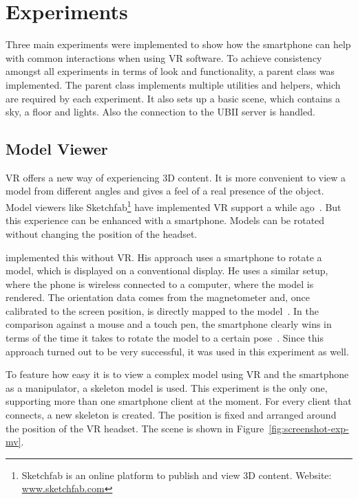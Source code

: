 \section{Experiments}\label{section:experiments}

Three main experiments were implemented to show how the smartphone can help with common interactions when using \ac{VR} software.
To achieve consistency amongst all experiments in terms of look and functionality, a parent class was implemented. The parent class implements multiple utilities and helpers, which are required by each experiment. It also sets up a basic scene, which contains a sky, a floor and lights.  Also the connection to the \ac{UBII} server is handled. 


\subsection{Model Viewer}\label{subsection:model-viewer}

\acl{VR} offers a new way of experiencing \ac{3D} content. It is more convenient to view a model from different angles and gives a feel of a real presence of the object. Model viewers like Sketchfab\footnote{Sketchfab is an online platform to publish and view 3D content. Website: \href{https://sketchfab.com}{www.sketchfab.com}} have implemented \ac{VR} support a while ago~\cite{Denoyel.2016}. But this experience can be enhanced with a smartphone. Models can be rotated without changing the position of the headset.

\citeauthor{Katzakis.2010} implemented this without \ac{VR}. His approach uses a smartphone to rotate a model, which is displayed on a conventional display. He uses a similar setup, where the phone is wireless connected to a computer, where the model is rendered. The orientation data comes from the magnetometer and, once calibrated to the screen position, is directly mapped to the model~\cite[139]{Katzakis.2010}. In the comparison against a mouse and a touch pen, the smartphone clearly wins in terms of the time it takes to rotate the model to a certain pose~\cite[140]{Katzakis.2010}. 
Since this approach turned out to be very successful, it was used in this experiment as well. 

To feature how easy it is to view a complex model using VR and the smartphone as a manipulator, a skeleton model is used. This experiment is the only one, supporting more than one smartphone client at the moment. For every client that connects, a new skeleton is created. The position is fixed and arranged around the position of the \ac{VR} headset. The scene is shown in Figure~\ref{fig:screenshot-exp-mv}.

